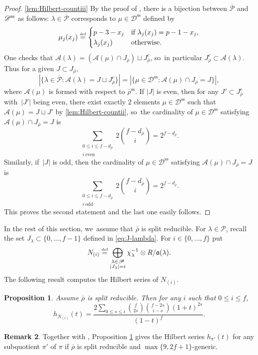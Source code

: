 \documentclass[JEP,XML,SOM,Unicode,NoFloatCountersInSection, NoEqCountersInSection,published]{cedram}
\newcommand{\defeq}{\stackrel{\textrm{\tiny{\upshape{def}}}}{=}}
\newcommand{\D}{\mathscr D}
\renewcommand{\P}{\mathscr P}
\renewcommand{\ss}{\mathrm{ss}}
\newcommand{\fa}{\mathfrak{a}}
\newcommand{\brho}{\overline{\rho}}
\theoremstyle{plain}
\newtheorem{prop1}{Proposition}[section]
\theoremstyle{definition}
\newtheorem{rem1}[prop1]{Remark}
\begin{document}
\begin{proof}
\eqref{lem:Hilbert-countiii}
By the proof of \cite[Lem.\,3.59]{BHHMS2}, there is a bijection between $\overline{\P}$ and $\D^{\rm ss}$ as follows: $\lambda\in \overline{\P}$ corresponds to $\mu\in \D^{\ss}$ defined by
\[
\mu_j(x_j)\defeq
\begin{cases}
p-3-x_j & \text{if $\lambda_j(x_j)=p-1-x_j$},\\
\lambda_j(x_j) & \text{otherwise}.
\end{cases}
\]
One checks that $\mathcal{A}(\lambda)=(\mathcal{A}(\mu)\cap J_{\brho})\sqcup J_{\brho}^c$, so~in particular $J_{\brho}^c\subset \mathcal{A}(\lambda)$.
Thus for a given $J\subset J_{\brho}$,
\[
|\{\lambda\in\overline{\P}:\mathcal{A}(\lambda)=J\sqcup J_{\brho}^c\}|=|\{\mu\in\D^{\ss}: \mathcal{A}(\mu)\cap J_{\brho}=J\}|,
\]
where $\mathcal{A}(\mu)$ is formed with respect to $\brho^{\ss}$.
If $|J|$ is even, then for any $J'\subset J_{\brho}^c$ with~$|J'|$ being even, there exist exactly $2$ elements $\mu\in\D^{\ss}$ such that $\mathcal{A}(\mu)=J\sqcup J'$ by \eqref{lem:Hilbert-countii}, so~the cardinality of $\mu\in\D^{\ss}$ satisfying $\mathcal{A}(\mu)\cap J_{\brho}=J$ is
\[
\sum_{\substack{0\leq i\leq f-d_{\brho}\\ i\ \text{even}}}2\binom{f-d_{\brho}}{i}=2^{f-d_{\brho}}.
\]
Similarly, if~$|J|$ is odd, then the cardinality of $\mu\in\D^{\ss}$ satisfying $\mathcal{A}(\mu)\cap J_{\brho}=J$ is
\[
\sum_{\substack{0\leq i\leq f-d_{\brho}\\ i\ \text{odd}}}2\binom{f-d_{\brho}}{i}=2^{f-d_{\brho}}.
\]
This proves the second statement and the last one easily follows.
\end{proof}

In the rest of this section, we~assume that $\brho$ is split reducible.
For $\lambda\in \P$, recall the set $J_{\lambda}\subset\{0,\dots,f-1\}$ defined in \eqref{eq:J-lambda}.
For $i\in\{0,\dots,f\}$ put
\[
N_{(i)}\defeq\bigoplus_{\substack{\lambda\in \P\\ |J_\lambda| = i}}\chi_{\lambda}^{-1}\otimes R/\fa(\lambda).
\]
The following result computes the Hilbert series of $N_{(i)}$.

\begin{prop1}\label{prop:Hilbert-split}
Assume $\brho$ is split reducible. Then for any $i$ such that $0\leq i\leq f$,
\[
h_{N_{(i)}}(t)=\frac{2\sum\limits_{0\leq s\leq i}\binom{f}{2s}\binom{f-2s}{i-s}(1+t)^{2s}}{(1-t)^f}.
\]
\end{prop1}
\begin{rem1}
Together with \cite[Cor.\,3.2.7(ii)]{BHHMS4},
Proposition \ref{prop:Hilbert-split} gives the Hilbert series {$h_{\pi'}(t)$}
for any subquotient $\pi'$ of $\pi$ if $\brho$ is split reducible and \hbox{$\max\{9,2f+1\}$}-generic.
\end{rem1}
\end{document}
